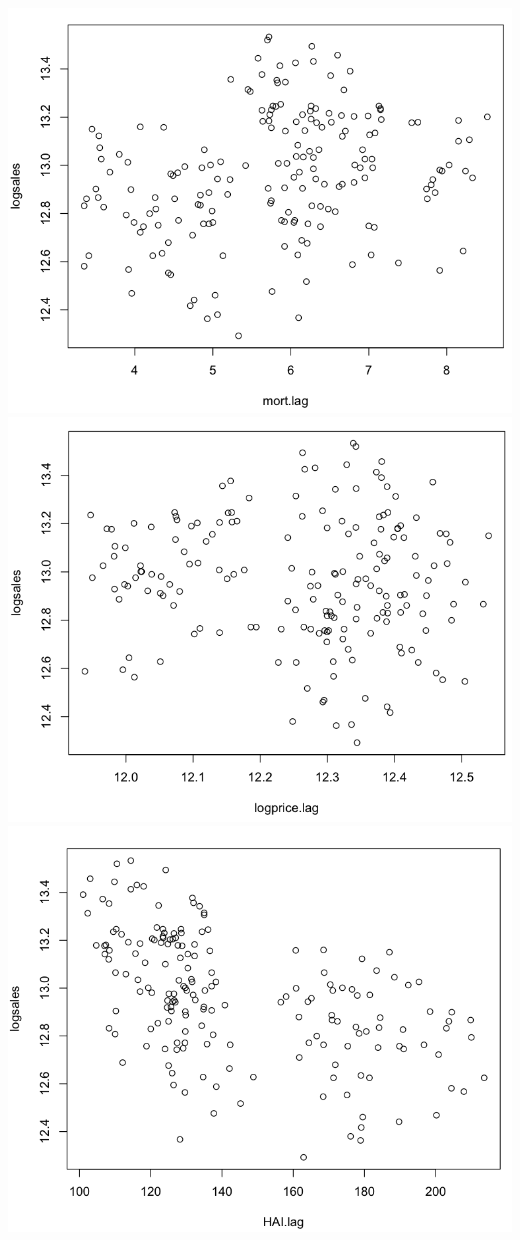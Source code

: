 \documentclass[a4 paper, 11 pt]{article}
\begin{document}
\begin{center}
\includegraphics[scale=0.3]{salesmort}
\includegraphics[scale=0.3]{salesprice}
\includegraphics[scale=0.3]{saleshai}
\end{center}
\end{document}
